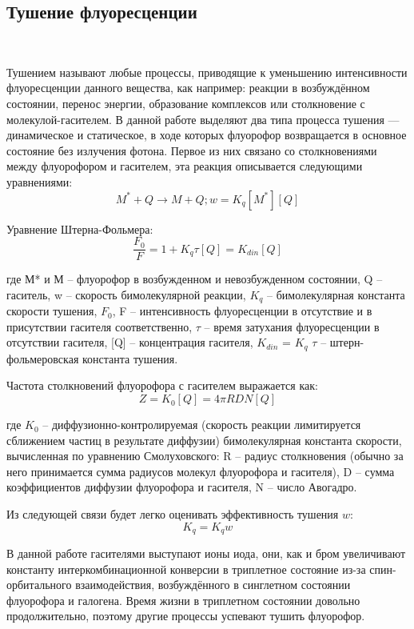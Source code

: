\documentclass{article}
\begin{document}
\subsection{Тушение флуоресценции}\
\par Тушением называют любые процессы, приводящие к уменьшению интенсивности флуоресценции данного вещества, как например: реакции в возбуждённом состоянии, перенос энергии, образование комплексов или столкновение с молекулой-гасителем. В данной работе выделяют два типа процесса тушения — динамическое и статическое, в ходе которых флуорофор возвращается в основное состояние без излучения фотона. Первое из них связано со столкновениями между флуорофором и гасителем, эта реакция описывается следующими уравнениями:
\begin{equation}
    M^{*} + Q \xrightarrow{} M + Q;   w = K_{q}[M^{*}][Q]
\end{equation}
\par Уравнение Штерна-Фольмера:
\begin{equation}
    \frac{F_{0}}{F} = 1 + K_{q} \tau [Q] = K_{din} [Q]
\end{equation}
\par где М* и М – флуорофор в возбужденном и невозбужденном состоянии, Q – гаситель, w – скорость бимолекулярной реакции, $K_{q}$ – бимолекулярная константа скорости тушения, $F_{0}$, F – интенсивность флуоресценции в отсутствие и в присутствии гасителя соответственно, $\tau$ – время затухания флуоресценции в отсутствии гасителя, [Q] –
концентрация гасителя, $K_{din}$ = $K_{q}$ $\tau$ – штерн-фольмеровская константа тушения.
\par Частота столкновений флуорофора с гасителем выражается как:
\begin{equation}
    Z = K_{0}[Q] = 4 \pi RDN[Q]
\end{equation}
\par где $K_{0}$ – диффузионно-контролируемая (скорость реакции лимитируется сближением частиц
в результате диффузии) бимолекулярная константа скорости, вычисленная
по уравнению Смолуховского:
R – радиус столкновения (обычно за него принимается сумма радиусов молекул
флуорофора и гасителя), D – сумма коэффициентов диффузии флуорофора и
гасителя, N – число Авогадро.
\par Из следующей связи будет легко оценивать эффективность тушения $w$:
\begin{equation}
    K_{q}= K_{q}w
\end{equation}
\par В данной работе гасителями выступают ионы иода, они, как и бром увеличивают константу интеркомбинационной конверсии в триплетное состояние из-за спин-орбитального взаимодействия, возбуждённого в синглетном состоянии флуорофора и галогена. Время жизни в триплетном состоянии довольно продолжительно, поэтому другие процессы успевают тушить флуорофор.
\end{document}
